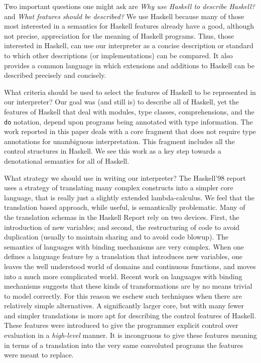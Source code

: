 \documentclass{entcs} \usepackage{entcsmacro}
\begin{document}
Two important questions one might ask are {\em Why use Haskell to describe
Haskell?} and {\em What features should be described?}  We use Haskell because
many of those most interested in a semantics for Haskell features already have a
good, although not precise, appreciation for the meaning of Haskell programs.
Thus, those interested in Haskell, can use our interpreter as a concise
description or standard to which other descriptions (or implementations) can be
compared. It also provides a common language in which extensions and additions
to Haskell can be described precisely and concisely.

What criteria should be used to select the features of Haskell to be represented in our
interpreter? Our goal was (and still is) to describe all of Haskell, yet the features of
Haskell that deal with modules, type classes, comprehensions, and the {\tt do} notation,
depend upon programs being annotated with type information. The work reported in this paper
deals with a core fragment that does not require type annotations for unambiguous
interpretation. This fragment includes all the control structures in Haskell. We see this
work as a key step towards a denotational semantics for all of Haskell.

What strategy we should use in writing our interpreter? The Haskell'98
report\cite{Haskell98} uses a strategy of translating many complex constructs into a
simpler core language\cite{newcore}, that is really just a slightly extended
lambda-calculus. We feel that the translation based approach, while useful, is semantically
problematic. Many of the translation schemas in the Haskell Report rely on two devices.
First, the introduction of new variables; and second, the restructuring of code to avoid
duplication (usually to maintain sharing and to avoid code blowup). The semantics of
languages with binding mechanisms are very complex. When one defines a language feature by
a translation that introduces new variables, one leaves the well understood world of
domains and continuous functions, and moves into a much more complicated world. Recent work
on languages with binding mechanisms suggests that these kinds of transformations are by no
means trivial to model correctly\cite{Moggi,Pitts00}. For this reason we eschew such
techniques when there are relatively simple alternatives. A significantly larger core, but
with many fewer and simpler translations is more apt for describing the control features of
Haskell. These features were introduced to give the programmer explicit control over
evaluation in a {\em high-level} manner. It is incongruous to give these features meaning
in terms of a translation into the very same convoluted programs the features were meant to
replace.
\end{document}
